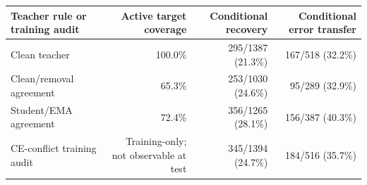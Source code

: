 \begin{tabular}{lrrr}
\toprule
Teacher rule or training audit & Active target coverage & Conditional recovery & Conditional error transfer \\
\midrule
Clean teacher & 100.0\% & 295/1387 (21.3\%) & 167/518 (32.2\%) \\
Clean/removal agreement & 65.3\% & 253/1030 (24.6\%) & 95/289 (32.9\%) \\
Student/EMA agreement & 72.4\% & 356/1265 (28.1\%) & 156/387 (40.3\%) \\
CE-conflict training audit & Training-only; not observable at test & 345/1394 (24.7\%) & 184/516 (35.7\%) \\
\bottomrule
\end{tabular}